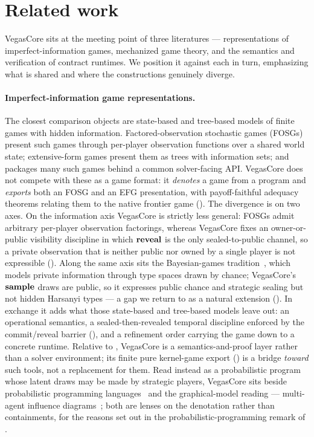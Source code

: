 \section{Related work}
\label{sec:related}

VegasCore sits at the meeting point of three literatures --- representations
of imperfect-information games, mechanized game theory, and the semantics and
verification of contract runtimes.  We position it against each in turn,
emphasizing what is shared and where the constructions genuinely diverge.

\paragraph{Imperfect-information game representations.}
The closest comparison objects are state-based and tree-based models of finite
games with hidden information.  Factored-observation stochastic games
(FOSGs)~\citep{Kovarik2022} present such games through per-player observation
functions over a shared world state; extensive-form games
\citep{vonNeumannMorgenstern1944,OsborneRubinstein1994} present them as trees
with information sets; and ~\citep{LanctotEtAl2019OpenSpiel}
packages many such games behind a common solver-facing API.  VegasCore does not
compete with these as a game format: it \emph{denotes} a game from a program
and \emph{exports} both an FOSG and an EFG presentation, with payoff-faithful
adequacy theorems relating them to the native frontier game
().  The divergence is on two axes.  On the information
axis VegasCore is strictly less general: FOSGs admit arbitrary per-player
observation factorings, whereas VegasCore fixes an owner-or-public visibility
discipline in which \(\mathbf{reveal}\) is the only sealed-to-public channel, so a
private observation that is neither public nor owned by a single player is not
expressible ().  Along the same axis sits the
Bayesian-games tradition~\citep{Harsanyi1967}, which models private information
through type spaces drawn by chance; VegasCore's \(\mathbf{sample}\) draws are public,
so it expresses public chance and strategic sealing but not hidden Harsanyi
types --- a gap we return to as a natural extension ().  In
exchange it adds what those
state-based and tree-based models leave out: an operational semantics, a
sealed-then-revealed temporal discipline enforced by the commit/reveal barrier
(), and a refinement order carrying the game down to a
concrete runtime.  Relative to , VegasCore is a
semantics-and-proof layer rather than a solver environment; its finite pure
kernel-game export () is a bridge \emph{toward} such
tools, not a replacement for them.  Read instead as a probabilistic program
whose latent draws may be made by strategic players, VegasCore sits beside
probabilistic programming
languages~\citep{Kozen1981,GordonProbabilistic,BorgstromEtAl2016Fun} and the
graphical-model reading --- multi-agent influence
diagrams~\citep{koller2003multi}; both are lenses on the denotation rather than
containments, for the reasons set out in the probabilistic-programming remark of
.

